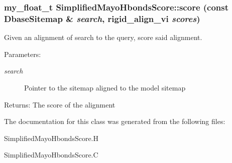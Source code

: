 \subsubsection{\setlength{\rightskip}{0pt plus 5cm}my\_\-float\_\-t Simplified\-Mayo\-Hbonds\-Score::score (const \bf{Dbase\-Sitemap} \& {\em search}, rigid\_\-align\_\-vi {\em scores})\hspace{0.3cm}{\tt  [protected]}}\label{classASCbase_1_1SimplifiedMayoHbondsScore_855918f5ffd04e320e9270f07878fc75}


Given an alignment of search to the query, score said alignment. 

\begin{Desc}
\item[Parameters:]
\begin{description}
\item[{\em search}]Pointer to the sitemap aligned to the model sitemap \end{description}
\end{Desc}
\begin{Desc}
\item[Returns:]The score of the alignment \end{Desc}


The documentation for this class was generated from the following files:\begin{CompactItemize}
\item 
Simplified\-Mayo\-Hbonds\-Score.H\item 
Simplified\-Mayo\-Hbonds\-Score.C\end{CompactItemize}
